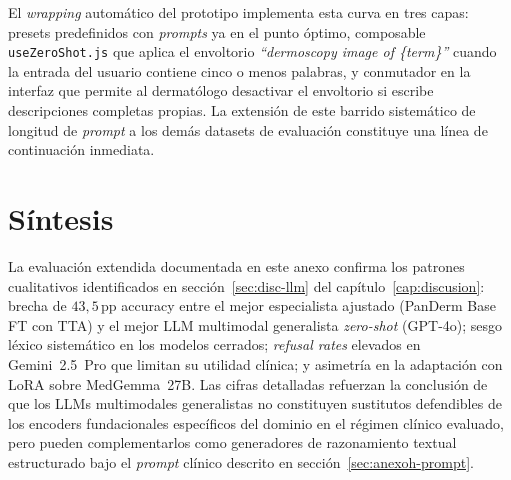 El \emph{wrapping} automático del prototipo implementa esta curva
en tres capas: presets predefinidos con \emph{prompts} ya en el
punto óptimo, composable \texttt{useZeroShot.js} que aplica el
envoltorio \emph{``dermoscopy image of \{term\}''} cuando la entrada
del usuario contiene cinco o menos palabras, y conmutador en la
interfaz que permite al dermatólogo desactivar el envoltorio si
escribe descripciones completas propias. La extensión de este barrido sistemático de
longitud de \emph{prompt} a los demás datasets de evaluación
constituye una línea de continuación inmediata.

\section{Síntesis}
\label{sec:anexoh-sintesis}

La evaluación extendida documentada en este anexo confirma los
patrones cualitativos identificados en sección~\ref{sec:disc-llm} del
capítulo~\ref{cap:discusion}: brecha de $43{,}5$\,pp accuracy
entre el mejor especialista ajustado (PanDerm Base FT con TTA) y el
mejor LLM multimodal generalista \emph{zero-shot} (GPT-4o); sesgo
léxico sistemático en los modelos cerrados; \emph{refusal rates}
elevados en Gemini~2.5~Pro que limitan su utilidad clínica; y
asimetría en la adaptación con LoRA sobre MedGemma~27B. Las
cifras detalladas refuerzan la conclusión de que los LLMs
multimodales generalistas no constituyen sustitutos defendibles
de los encoders fundacionales específicos del dominio en el
régimen clínico evaluado, pero pueden complementarlos como
generadores de razonamiento textual estructurado bajo el
\emph{prompt} clínico descrito en sección~\ref{sec:anexoh-prompt}.
